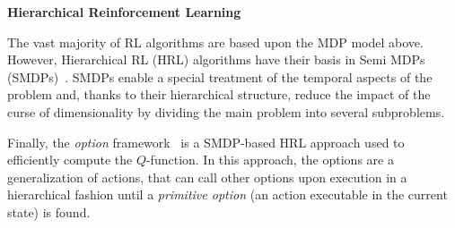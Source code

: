 %




\textbf{Hierarchical Reinforcement Learning}

The vast majority of RL algorithms are based upon the MDP model above. However, Hierarchical RL (HRL) algorithms have their basis in Semi MDPs (SMDPs)~\cite{barto2003}. SMDPs enable a special treatment of the temporal aspects of the problem and, thanks to their hierarchical structure, reduce the impact of the curse of dimensionality by dividing the main problem into several subproblems.

%

%
%

Finally, the \emph{option} framework~\cite{sutton1999} is a SMDP-based HRL approach used to  efficiently compute the $Q$-function. In this approach, the options are a generalization of actions, that can call other options upon execution in a hierarchical fashion until a \emph{primitive option} (an action executable in the current state) is found. 

%

